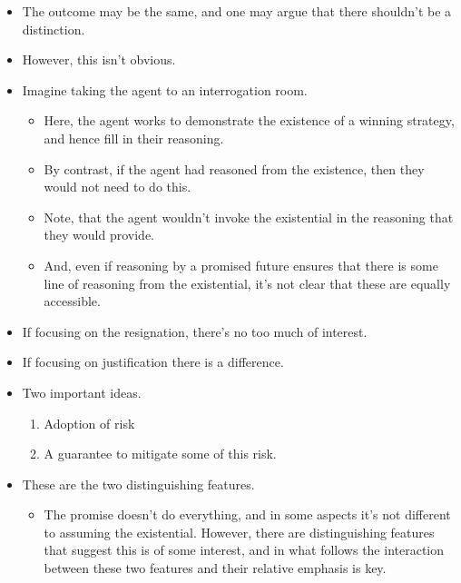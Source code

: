 \documentclass[10pt]{article}
\begin{document}
\begin{itemize}
\item The outcome may be the same, and one may argue that there shouldn't be a distinction.
\item However, this isn't obvious.
\item Imagine taking the agent to an interrogation room.
  \begin{itemize}
  \item Here, the agent works to demonstrate the existence of a winning strategy, and hence fill in their reasoning.
  \item By contrast, if the agent had reasoned from the existence, then they would not need to do this.
  \item Note, that the agent wouldn't invoke the existential in the reasoning that they would provide.
  \item And, even if reasoning by a promised future ensures that there is some line of reasoning from the existential, it's not clear that these are equally accessible.
  \end{itemize}
\item If focusing on the resignation, there's no too much of interest.
\item If focusing on justification there is a difference.
\end{itemize}

\begin{itemize}
\item Two important ideas.
  \begin{enumerate}
  \item Adoption of risk
  \item A guarantee to mitigate some of this risk.
  \end{enumerate}
\item These are the two distinguishing features.
  \begin{itemize}
  \item The promise doesn't do everything, and in some aspects it's not different to assuming the existential.
    However, there are distinguishing features that suggest this is of some interest, and in what follows the interaction between these two features and their relative emphasis is key.
  \end{itemize}
\end{itemize}



\newpage

\printbibliography
\end{document}
